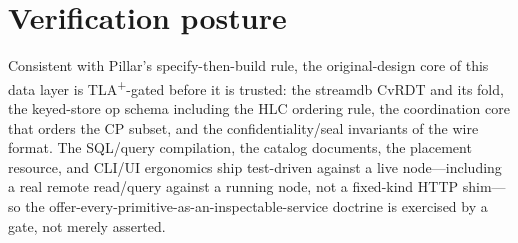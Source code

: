 \documentclass[10pt,twocolumn]{article}
\begin{document}
\section{Verification posture}
Consistent with Pillar's specify-then-build rule, the original-design core of this
data layer is TLA\textsuperscript{+}-gated before it is trusted: the streamdb CvRDT and
its fold, the keyed-store op schema including the HLC ordering rule, the coordination
core that orders the CP subset, and the confidentiality/seal invariants of the wire
format. The SQL/query compilation, the catalog documents, the placement resource, and
CLI/UI ergonomics ship test-driven against a live node---including a real remote
read/query against a running node, not a fixed-kind HTTP shim---so the
offer-every-primitive-as-an-inspectable-service doctrine is exercised by a gate, not
merely asserted.
\end{document}

